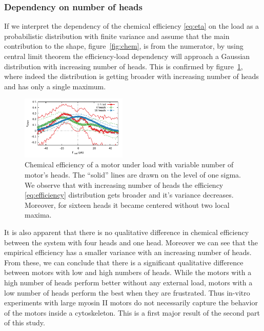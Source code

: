 \documentclass[aps,pre,twocolumn,showpacs,showkeys,superscriptaddress,floatfix]{revtex4-1}
\begin{document}
\subsubsection{Dependency on number of heads}
If we interpret the dependency of the chemical efficiency \eqref{eq:eta} on the load as a probabilistic distribution with finite variance and assume that the main contribution to the shape, figure~\ref{fig:chem}, is from the numerator, 
by using central limit theorem the efficiency-load dependency will approach a Gaussian distribution with increasing number of heads. 
This is confirmed by figure~\ref{fig:chem_eff_1head}, where indeed the distribution is getting broader with increasing number of heads and has only a single maximum.
\begin{figure}[t]
\centering
\includegraphics[width=0.45\textwidth,height=!]{chemical_cycle_1head}
\caption{
\label{fig:chem_eff_1head}
Chemical efficiency of a motor under load with variable number of motor's heads.
The ``solid'' lines are drawn on the level of one sigma. 
We observe that with increasing number of heads the efficiency \eqref{eq:efficiency} distribution gets broader and it's variance decreases.
Moreover, for sixteen heads it became centered without two local maxima.
}
\end{figure}
It is also apparent that there is no qualitative difference in chemical efficiency between the system with four heads and one head.
Moreover we can see that the empirical efficiency has a smaller variance with an increasing number of heads. 
From these, we can conclude that there is a significant qualitative difference between motors with low and high numbers of heads.
While the motors with a high number of heads perform better without any external load, motors with a low number of heads perform the best when they are frustrated.
Thus in-vitro experiments with large myosin II motors \cite{brown2009cross-correlated} do not necessarily capture the behavior of the motors inside a cytoskeleton.
This is a first major result of the second part of this study.  
\end{document}
